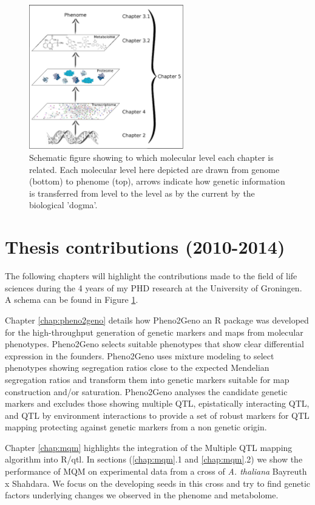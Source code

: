 \begin{figure}[h!]
 \centering
    \includegraphics[width=0.6\textwidth]{eps/image_1_3}
  \caption[ThesisLayout.]
    {Schematic figure showing to which molecular level each chapter is related. Each molecular 
    level here depicted are drawn from genome (bottom) to phenome (top), arrows indicate 
    how genetic information is transferred from level to the level as by the current by 
    the biological 'dogma'.}
    \label{fig:layout}
\end{figure}

\section{Thesis contributions (2010-2014)}
The following chapters will highlight the contributions made to the field of life 
sciences during the 4 years of my PHD research at the University of Groningen. A schema 
can be found in Figure \ref{fig:layout}.

Chapter \ref{chap:pheno2geno} details how Pheno2Geno an R package was developed for 
the high-throughput generation of genetic markers and maps from molecular phenotypes. 
Pheno2Geno selects suitable phenotypes that show clear differential expression in the founders. Pheno2Geno 
uses mixture modeling to select phenotypes showing segregation ratios close to the 
expected Mendelian segregation ratios and transform them into genetic markers suitable 
for map construction and/or saturation. Pheno2Geno analyses the candidate genetic 
markers and excludes those showing multiple QTL, epistatically interacting QTL, and QTL 
by environment interactions to provide a set of robust markers for QTL mapping protecting 
against genetic markers from a non genetic origin.

Chapter \ref{chap:mqm} highlights the integration of the Multiple QTL mapping algorithm 
into R/qtl. In sections (\ref{chap:mqm}.1 and  \ref{chap:mqm}.2) we show the performance 
of MQM on experimental data from a cross of \emph{A. thaliana} Bayreuth x Shahdara. We 
focus on the developing seeds in this cross and try to find genetic factors underlying 
changes we observed in the phenome and metabolome.


